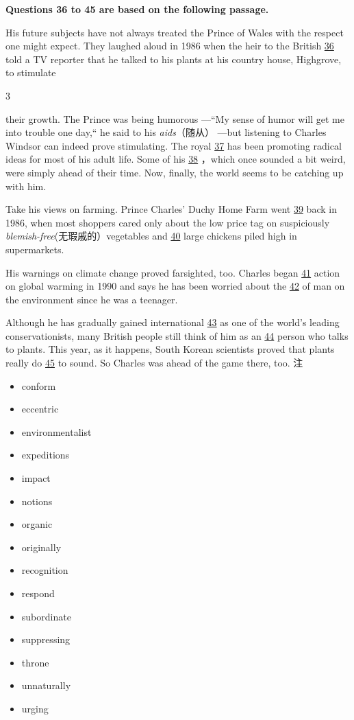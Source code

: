 \documentclass[UTF8,11pt]{ctexart}
\begin{document}
\textbf{Questions 36 to 45 are based on the following passage.}


His future subjects have not always treated the Prince of Wales with the respect one might expect. They laughed aloud in 1986 when the heir to the British \uline{36} told a TV reporter that he talked to his plants at his country house, Highgrove, to stimulate


3


their growth. The Prince was being humorous —“My sense of humor will get me into trouble one day,“ he said to his\textit{ aids}（随从） —but listening to Charles Windsor can indeed prove stimulating. The royal \uline{37} has been promoting radical ideas for most of his adult life. Some of his \uline{38} ，which once sounded a bit weird, were simply ahead of their time. Now, finally, the world seems to be catching up with him.


Take his views on farming. Prince Charles’ Duchy Home Farm went \uline{39} back in 1986, when most shoppers cared only about the low price tag on suspiciously\textit{ blemish-free}(无瑕戚的）vegetables and \uline{40} large chickens piled high in supermarkets.


His warnings on climate change proved farsighted, too. Charles began \uline{41} action on global warming in 1990 and says he has been worried about the \uline{42} of man on the environment since he was a teenager.


Although he has gradually gained international \uline{43} as one of the world’s leading conservationists, many British people still think of him as an \uline{44} person who talks to plants. This year, as it happens, South Korean scientists proved that plants really do \uline{45} to sound. So Charles was ahead of the game there, too. 注


\begin{itemize}[leftmargin=2em,itemsep=.2em,topsep=.4em]\item[A.] conform
\item[B.] eccentric
\item[C.] environmentalist
\item[D.] expeditions
\item[E.] impact
\item[F.] notions
\item[G.] organic
\item[H.] originally
\item[I.] recognition
\item[J.] respond
\item[K.] subordinate
\item[L.] suppressing
\item[M.] throne
\item[N.] unnaturally
\item[O.] urging
\end{itemize}
\end{document}
